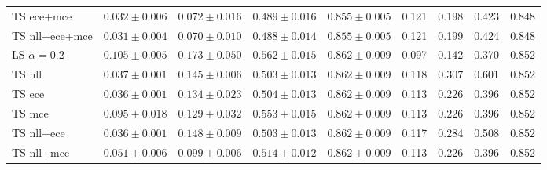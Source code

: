 \begin{table}[h!]
{\begin{tabular}{l|cccc|m{0.8cm}m{0.8cm}m{0.8cm}m{0.8cm}|}
			TS ece+mce & \multicolumn{1}{c|}{$0.032 \pm 0.006$} & \multicolumn{1}{c|}{$0.072 \pm 0.016$} & \multicolumn{1}{c|}{$0.489 \pm 0.016$} & \multicolumn{1}{c|}{$0.855 \pm 0.005$} & \multicolumn{1}{c|}{0.121} & \multicolumn{1}{c|}{0.198} & \multicolumn{1}{c|}{0.423} & \multicolumn{1}{c|}{0.848} \\
			TS nll+ece+mce & \multicolumn{1}{c|}{$0.031 \pm 0.004$} & \multicolumn{1}{c|}{$0.070 \pm 0.010$} & \multicolumn{1}{c|}{$0.488 \pm 0.014$} & \multicolumn{1}{c|}{$0.855 \pm 0.005$} & \multicolumn{1}{c|}{0.121} & \multicolumn{1}{c|}{0.199} & \multicolumn{1}{c|}{0.424} & \multicolumn{1}{c|}{0.848} \\ \hline \hline
			LS $\alpha=0.2$ & \multicolumn{1}{c|}{$0.105 \pm 0.005$} & \multicolumn{1}{c|}{$0.173 \pm 0.050$} & \multicolumn{1}{c|}{$0.562 \pm 0.015$} & \multicolumn{1}{c|}{$0.862 \pm 0.009$} & \multicolumn{1}{c|}{0.097} & \multicolumn{1}{c|}{0.142} & \multicolumn{1}{c|}{0.370} & \multicolumn{1}{c|}{0.852} \\
			TS nll & \multicolumn{1}{c|}{$0.037 \pm 0.001$} & \multicolumn{1}{c|}{$0.145 \pm 0.006$} & \multicolumn{1}{c|}{$0.503 \pm 0.013$} & \multicolumn{1}{c|}{$0.862 \pm 0.009$} & \multicolumn{1}{c|}{0.118} & \multicolumn{1}{c|}{0.307} & \multicolumn{1}{c|}{0.601} & \multicolumn{1}{c|}{0.852} \\
			TS ece & \multicolumn{1}{c|}{$0.036 \pm 0.001$} & \multicolumn{1}{c|}{$0.134 \pm 0.023$} & \multicolumn{1}{c|}{$0.504 \pm 0.013$} & \multicolumn{1}{c|}{$0.862 \pm 0.009$} & \multicolumn{1}{c|}{0.113} & \multicolumn{1}{c|}{0.226} & \multicolumn{1}{c|}{0.396} & \multicolumn{1}{c|}{0.852} \\
			TS mce & \multicolumn{1}{c|}{$0.095 \pm 0.018$} & \multicolumn{1}{c|}{$0.129 \pm 0.032$} & \multicolumn{1}{c|}{$0.553 \pm 0.015$} & \multicolumn{1}{c|}{$0.862 \pm 0.009$} & \multicolumn{1}{c|}{0.113} & \multicolumn{1}{c|}{0.226} & \multicolumn{1}{c|}{0.396} & \multicolumn{1}{c|}{0.852} \\
			TS nll+ece & \multicolumn{1}{c|}{$0.036 \pm 0.001$} & \multicolumn{1}{c|}{$0.148 \pm 0.009$} & \multicolumn{1}{c|}{$0.503 \pm 0.013$} & \multicolumn{1}{c|}{$0.862 \pm 0.009$} & \multicolumn{1}{c|}{0.117} & \multicolumn{1}{c|}{0.284} & \multicolumn{1}{c|}{0.508} & \multicolumn{1}{c|}{0.852} \\
			TS nll+mce & \multicolumn{1}{c|}{$0.051 \pm 0.006$} & \multicolumn{1}{c|}{$0.099 \pm 0.006$} & \multicolumn{1}{c|}{$0.514 \pm 0.012$} & \multicolumn{1}{c|}{$0.862 \pm 0.009$} & \multicolumn{1}{c|}{0.113} & \multicolumn{1}{c|}{0.226} & \multicolumn{1}{c|}{0.396} & \multicolumn{1}{c|}{0.852} \\

\end{tabular}}
\end{table}
